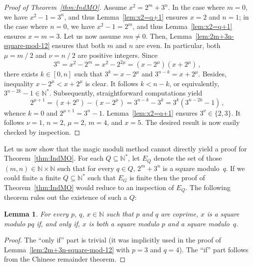 \documentclass[12pt]{article}
\newcommand{\bZ}{\mathbb{Z}}
\newcommand{\bN}{\mathbb{N}} %
\newcommand{\bNast}{\bN^*}
\newcommand{\binover}{\mathbin{/}}
\newtheorem{lemma}{Lemma}
\theoremstyle{definition}
\begin{document}
   
   \begin{proof}[Proof of Theorem~\ref{thm:IndMO}]
     Assume $x^2 = 2^m + 3^n$.
     In the case where $m = 0$,
     we have $x^2 - 1 = 3^n$,
     and thus Lemma~\ref{lem:x2=q+1} ensures $x = 2$ and $n = 1$;
     in the case where $n = 0$,
     we have $x^2 - 1 = 2^m$,
     and thus Lemma~\ref{lem:x2=q+1} ensures $x = m = 3$.
     Let us now assume $mn \ne 0$.
     Then, Lemma~\ref{lem:2m+3n-square-mod-12} ensures that both $m$ and $n$ are even.
     In particular, both $\mu = m \binover 2$ and $\nu = n \binover 2$ are positive integers.
     Since 
     $$
     3^n = x^2 - 2^m = x^2 - 2^{2\mu} = (x - 2^\mu)(x + 2^\mu) \,, 
     $$
     there exists $k \in [0, n]$ such that $3^k = x - 2^\mu$ and $3^{n - k} = x + 2^\mu$.
     Besides, inequality $x - 2^\mu < x + 2^\mu$ is clear. 
     It follows $k < n - k$, or equivalently, $3^{n - 2 k} - 1 \in \bNast$.
     Subsequently, straightforward computations yield
     $$
     2^{\mu + 1} = (x + 2^\mu) - (x - 2^\mu) = 3^{n - k} - 3^k = 3^k \left( 3^{n - 2k} - 1 \right) \,,
     $$
     whence $k = 0$ and $2^{\mu + 1} = 3^n - 1$.
     Lemma~\ref{lem:x2=q+1} ensures $3^\nu \in \{ 2, 3 \}$.
     It follows $\nu = 1$, $n = 2$, $\mu = 2$, $m = 4$, and $x = 5$.
     The desired result is now easily checked by inspection. 
  \end{proof}

  Let us now show that 
  the magic moduli method cannot directly yield a proof for Theorem~\ref{thm:IndMO}.
  For each $Q \subseteq \bNast$,
  let $E_Q$ denote the set of those $(m, n) \in \bN \times \bN$ such that for every $q \in Q$,
  $2^m + 3^n$ is a square modulo~$q$.
  If we could finite a finite $Q \subseteq \bNast$ such that $E_G$ is finite
  then the proof of Theorem~\ref{thm:IndMO} would reduce to an inspection of $E_Q$.
  The following theorem rules out the existence of such a $Q$:

  \begin{lemma} \label{lem:square-mn-m-n}
   For every $p$, $q$, $x \in \bN$ such that $p$ and $q$ are coprime,
   $x$ is a square modulo $p q$
   if, and only if, $x$ is both a square modulo $p$ and a square modulo~$q$.
 \end{lemma}

 \begin{proof}
   The ``only if'' part is trivial
   (it was implicitly  used in the proof of Lemma~\ref{lem:2m+3n-square-mod-12} with $p = 3$ and $q = 4$).
   The ``if'' part follows from the Chinese remainder theorem.
 \end{proof} 
\end{document}
